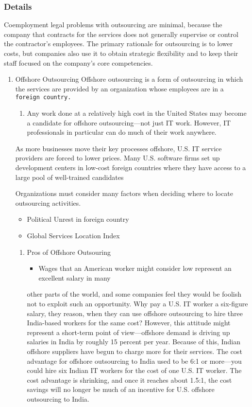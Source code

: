 \documentclass[11pt]{article}
\begin{document}
\subsubsection{Details}
\label{sec:orgbedf9de}
Coemployment legal problems with outsourcing are minimal, because the company that contracts for the services does not generally supervise or control the contractor’s employees. The primary rationale for outsourcing is to lower costs, but companies also use it to obtain strategic flexibility and to keep their staff focused on the company’s core competencies.
\begin{enumerate}
\item Offshore Outsourcing
\label{sec:orgc5571ed}
Offshore outsourcing is a form of outsourcing in which the services are provided by an organization whose employees are in a \texttt{foreign country.}

\begin{enumerate}
\item Any work done at a relatively high cost in the United States may become a candidate for offshore outsourcing—not just IT work. However, IT professionals in particular can do much of their work anywhere.
\end{enumerate}

As more businesses move their key processes offshore, U.S. IT service providers are forced to lower prices. Many U.S. software firms set up development centers in low-cost foreign countries where they have access to a large pool of well-trained candidates

Organizations must consider many factors when deciding where to locate outsourcing
activities.
\begin{itemize}
\item Political Unrest in foreign country
\item Global Services Location Index
\end{itemize}

\begin{enumerate}
\item Pros of Offshore Outsouring
\label{sec:org498e6ac}
\begin{itemize}
\item Wages that an American worker might consider low represent an excellent salary in many
\end{itemize}
other parts of the world, and some companies feel they would be foolish not to exploit such
an opportunity. Why pay a U.S. IT worker a six-figure salary, they reason, when they can
use offshore outsourcing to hire three India-based workers for the same cost? However, this
attitude might represent a short-term point of view—offshore demand is driving up salaries
in India by roughly 15 percent per year. Because of this, Indian offshore suppliers have
begun to charge more for their services. The cost advantage for offshore outsourcing to India
used to be 6:1 or more—you could hire six Indian IT workers for the cost of one U.S. IT
worker. The cost advantage is shrinking, and once it reaches about 1.5:1, the cost savings
will no longer be much of an incentive for U.S. offshore outsourcing to India.


\end{enumerate}
\end{enumerate}
\end{document}
